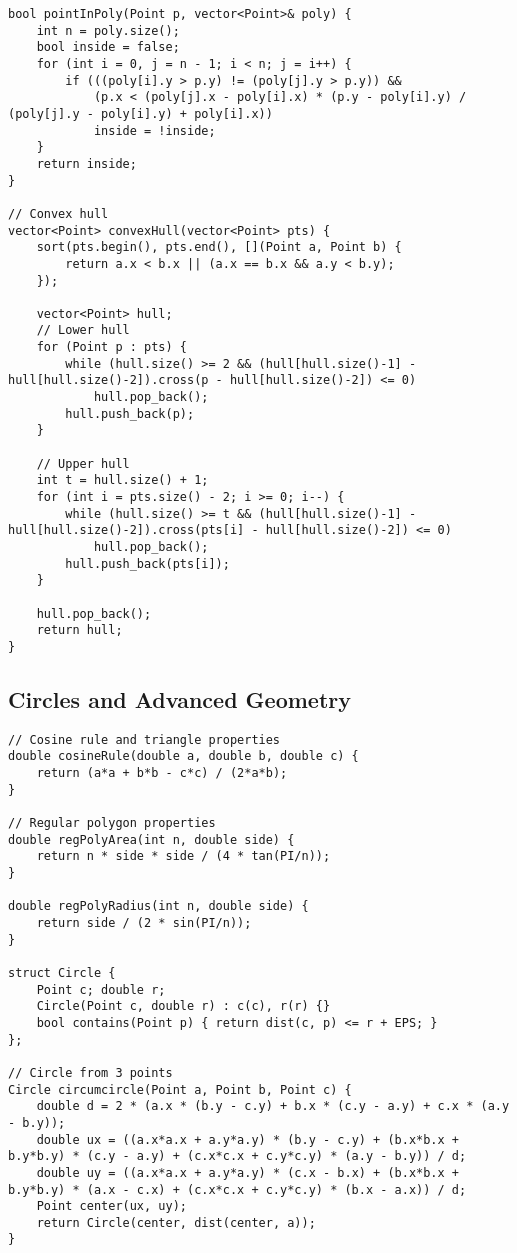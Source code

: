 \documentclass[11pt,a4paper]{article}
\begin{document}
\newpage

\begin{lstlisting}[caption={Point in Polygon and Convex Hull}]
bool pointInPoly(Point p, vector<Point>& poly) {
    int n = poly.size();
    bool inside = false;
    for (int i = 0, j = n - 1; i < n; j = i++) {
        if (((poly[i].y > p.y) != (poly[j].y > p.y)) &&
            (p.x < (poly[j].x - poly[i].x) * (p.y - poly[i].y) / (poly[j].y - poly[i].y) + poly[i].x))
            inside = !inside;
    }
    return inside;
}

// Convex hull
vector<Point> convexHull(vector<Point> pts) {
    sort(pts.begin(), pts.end(), [](Point a, Point b) { 
        return a.x < b.x || (a.x == b.x && a.y < b.y); 
    });
    
    vector<Point> hull;
    // Lower hull
    for (Point p : pts) {
        while (hull.size() >= 2 && (hull[hull.size()-1] - hull[hull.size()-2]).cross(p - hull[hull.size()-2]) <= 0)
            hull.pop_back();
        hull.push_back(p);
    }
    
    // Upper hull
    int t = hull.size() + 1;
    for (int i = pts.size() - 2; i >= 0; i--) {
        while (hull.size() >= t && (hull[hull.size()-1] - hull[hull.size()-2]).cross(pts[i] - hull[hull.size()-2]) <= 0)
            hull.pop_back();
        hull.push_back(pts[i]);
    }
    
    hull.pop_back();
    return hull;
}
\end{lstlisting}

\newpage

\subsection{Circles and Advanced Geometry}
\begin{lstlisting}[caption={Circle Operations and Properties}]
// Cosine rule and triangle properties
double cosineRule(double a, double b, double c) {
    return (a*a + b*b - c*c) / (2*a*b);
}

// Regular polygon properties
double regPolyArea(int n, double side) {
    return n * side * side / (4 * tan(PI/n));
}

double regPolyRadius(int n, double side) {
    return side / (2 * sin(PI/n));
}

struct Circle {
    Point c; double r;
    Circle(Point c, double r) : c(c), r(r) {}
    bool contains(Point p) { return dist(c, p) <= r + EPS; }
};

// Circle from 3 points
Circle circumcircle(Point a, Point b, Point c) {
    double d = 2 * (a.x * (b.y - c.y) + b.x * (c.y - a.y) + c.x * (a.y - b.y));
    double ux = ((a.x*a.x + a.y*a.y) * (b.y - c.y) + (b.x*b.x + b.y*b.y) * (c.y - a.y) + (c.x*c.x + c.y*c.y) * (a.y - b.y)) / d;
    double uy = ((a.x*a.x + a.y*a.y) * (c.x - b.x) + (b.x*b.x + b.y*b.y) * (a.x - c.x) + (c.x*c.x + c.y*c.y) * (b.x - a.x)) / d;
    Point center(ux, uy);
    return Circle(center, dist(center, a));
}
\end{lstlisting}
\end{document}
